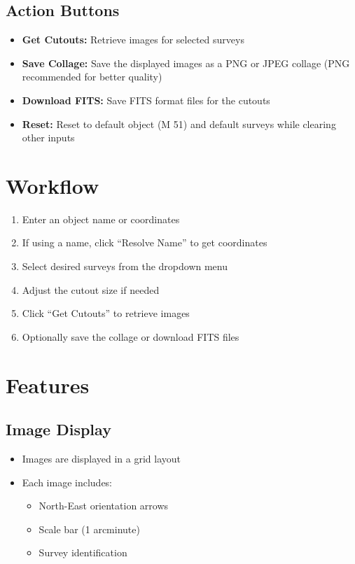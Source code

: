 \documentclass{article}
\begin{document}
\subsection{Action Buttons}
\begin{itemize}
    \item \textbf{Get Cutouts:} Retrieve images for selected surveys
    \item \textbf{Save Collage:} Save the displayed images as a PNG or JPEG collage (PNG recommended for better quality)
    \item \textbf{Download FITS:} Save FITS format files for the cutouts
    \item \textbf{Reset:} Reset to default object (M 51) and default surveys while clearing other inputs
\end{itemize}

\section{Workflow}
\begin{enumerate}
    \item Enter an object name or coordinates
    \item If using a name, click ``Resolve Name'' to get coordinates
    \item Select desired surveys from the dropdown menu
    \item Adjust the cutout size if needed
    \item Click ``Get Cutouts'' to retrieve images
    \item Optionally save the collage or download FITS files
\end{enumerate}

\section{Features}
\subsection{Image Display}
\begin{itemize}
    \item Images are displayed in a grid layout
    \item Each image includes:
        \begin{itemize}
            \item North-East orientation arrows
            \item Scale bar (1 arcminute)
            \item Survey identification
        \end{itemize}
\end{itemize}
\end{document}
